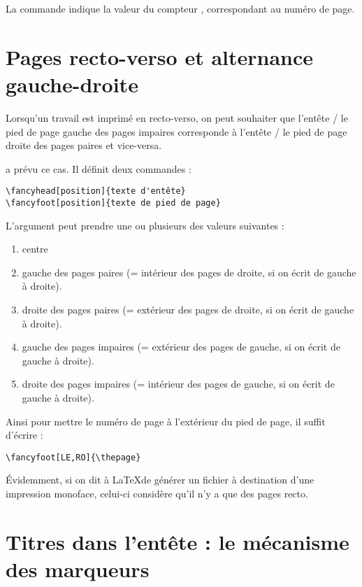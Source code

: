 La commande  indique la valeur du compteur , correspondant au numéro de page.



\section{Pages recto-verso et alternance gauche-droite}

Lorsqu'un travail est imprimé en recto-verso, on peut souhaiter que l'entête / le pied de page gauche des pages impaires corresponde à l'entête / le pied de page droite des pages paires et vice-versa.

 a prévu ce cas. Il définit deux commandes : 
\begin{verbatim}
\fancyhead[position]{texte d'entête}
\fancyfoot[position]{texte de pied de page}
\end{verbatim}

L'argument  peut prendre une ou plusieurs des valeurs suivantes :
\begin{enumerate}
\item[C]centre
\item[LO]gauche des pages paires (= intérieur des pages de droite, si on écrit de gauche à droite).
\item[RO]droite des pages paires (= extérieur des pages de droite, si on écrit de gauche à droite).
\item[LE]gauche des pages impaires (= extérieur des pages  de gauche, si on écrit de gauche à droite).
\item[RE]droite des pages impaires (= intérieur des pages de gauche, si on écrit de gauche à droite).
\end{enumerate}

Ainsi pour mettre le numéro de page à l'extérieur du pied de page, il suffit d'écrire :

\begin{verbatim}
\fancyfoot[LE,RO]{\thepage}
\end{verbatim}

Évidemment, si on dit à \LaTeX de générer un fichier à destination d'une impression monoface, celui-ci considère qu'il n'y a que des pages recto.

\section{Titres dans l'entête : le mécanisme des marqueurs}

